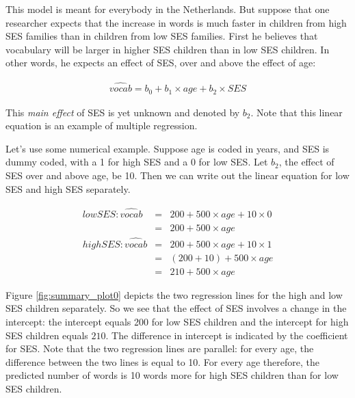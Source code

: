 \documentclass[]{book}\usepackage[]{graphicx}\usepackage[]{color}
\begin{document}
This model is meant for everybody in the Netherlands. But suppose that one researcher expects that the increase in words is much faster in children from high SES families than in children from low SES families. First he believes that vocabulary will be larger in higher SES children than in low SES children. In other words, he expects an effect of SES, over and above the effect of age:

\begin{eqnarray}
\widehat{vocab} = b_0 + b_1 \times age + b_2 \times SES
\end{eqnarray}

This \textit{main effect} of SES is yet unknown and denoted by $b_2$. Note that this linear equation is an example of multiple regression.


Let's use some numerical example. Suppose age is coded in years, and SES is dummy coded, with a 1 for high SES and a 0 for low SES. Let $b_2$, the effect of SES over and above age, be 10. Then we can write out the linear equation for low SES and high SES separately.


\begin{eqnarray}
low SES: \widehat{vocab} &=& 200 + 500 \times age + 10 \times 0  \\
&=& 200 + 500 \times age \\
high SES: \widehat{vocab} &=& 200 + 500 \times age + 10 \times 1  \\
&=& (200+10) + 500 \times age \\
&=& 210 + 500 \times age
\end{eqnarray}

Figure \ref{fig:summary_plot0} depicts the two regression lines for the high and low SES children separately. So we see that the effect of SES involves a change in the intercept: the intercept equals 200 for low SES children and the intercept for high SES children equals $210$. The difference in intercept is indicated by the coefficient for SES. Note that the two regression lines are parallel: for every age, the difference between the two lines is equal to 10. For every age therefore, the predicted number of words is 10 words more for high SES children than for low SES children.
\end{document}
